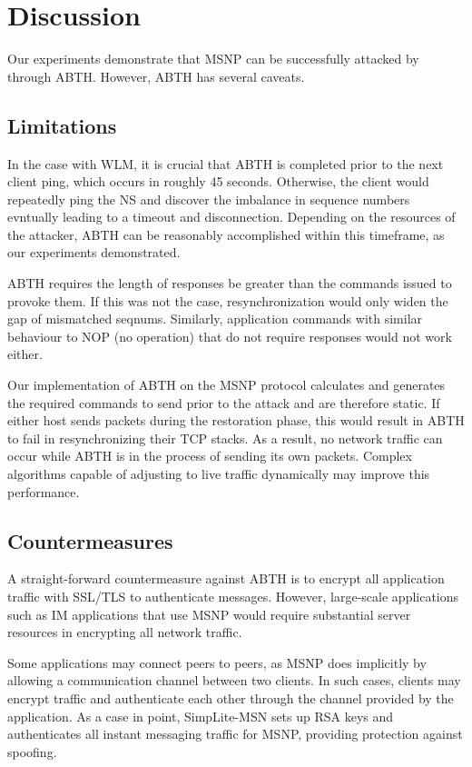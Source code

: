 \documentclass{sig-alternate}
\begin{document}
\section{Discussion}

Our experiments demonstrate that MSNP can be successfully attacked by through ABTH. However, ABTH has several caveats.

\subsection{Limitations}

In the case with WLM, it is crucial that ABTH is completed prior to the next client ping, which occurs in roughly 45 seconds. Otherwise, the client would repeatedly ping the NS and discover the imbalance in sequence numbers evntually leading to a timeout and disconnection. Depending on the resources of the attacker, ABTH can be reasonably accomplished within this timeframe, as our experiments demonstrated.

ABTH requires the length of responses be greater than the commands issued to provoke them. If this was not the case, resynchronization would only widen the gap of mismatched seqnums. Similarly, application commands with similar behaviour to NOP (no operation) that do not require responses would not work either.

Our implementation of ABTH on the MSNP protocol calculates and generates the required commands to send prior to the attack and are therefore static. If either host sends packets during the restoration phase, this would result in ABTH to fail in resynchronizing their TCP stacks. As a result, no network traffic can occur while ABTH is in the process of sending its own packets. Complex algorithms capable of adjusting to live traffic dynamically may improve this performance.

\subsection{Countermeasures}

A straight-forward countermeasure against ABTH is to encrypt all application traffic with SSL/TLS to authenticate messages.
However, large-scale applications such as IM applications that use MSNP would require substantial server resources in encrypting all network traffic.

Some applications may connect peers to peers, as MSNP does implicitly by allowing a communication channel between two clients.
In such cases, clients may encrypt traffic and authenticate each other through the channel provided by the application.
As a case in point, SimpLite-MSN \cite{secway:url} sets up RSA keys and authenticates all instant messaging traffic for MSNP, providing protection against spoofing.
\end{document}
